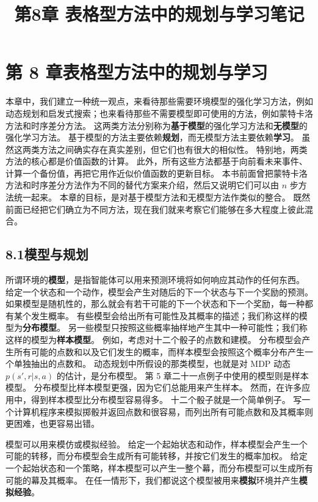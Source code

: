 \documentclass[UTF8,12pt,a4paper,fontset=fandol]{ctexart}
\title{第8章 表格型方法中的规划与学习笔记}
\author{}
\date{}
\begin{document}
\maketitle

\section*{第 8 章\quad 表格型方法中的规划与学习}

本章中，我们建立一种统一观点，来看待那些需要环境模型的强化学习方法，例如动态规划和启发式搜索；也来看待那些不需要模型即可使用的方法，例如蒙特卡洛方法和时序差分方法。
这两类方法分别称为\textbf{基于模型}的强化学习方法和\textbf{无模型}的强化学习方法。
基于模型的方法主要依赖\textbf{规划}，而无模型方法主要依赖\textbf{学习}。
虽然这两类方法之间确实存在真实差别，但它们也有很大的相似性。
特别地，两类方法的核心都是价值函数的计算。
此外，所有这些方法都基于向前看未来事件、计算一个备份值，再把它用作近似价值函数的更新目标。
本书前面曾把蒙特卡洛方法和时序差分方法作为不同的替代方案来介绍，然后又说明它们可以由 $n$ 步方法统一起来。
本章的目标，是对基于模型方法和无模型方法作类似的整合。
既然前面已经把它们确立为不同方法，现在我们就来考察它们能够在多大程度上彼此混合。

\subsection*{8.1\quad 模型与规划}

所谓环境的\textbf{模型}，是指智能体可以用来预测环境将如何响应其动作的任何东西。
给定一个状态和一个动作，模型会产生对随后的下一个状态与下一个奖励的预测。
如果模型是随机性的，那么就会有若干可能的下一个状态和下一个奖励，每一种都有某个发生概率。
有些模型会给出所有可能性及其概率的描述；我们称这样的模型为\textbf{分布模型}。
另一些模型只按照这些概率抽样地产生其中一种可能性；我们称这样的模型为\textbf{样本模型}。
例如，考虑对十二个骰子的点数和建模。
分布模型会产生所有可能的点数和以及它们发生的概率，而样本模型会按照这个概率分布产生一个单独抽出的点数和。
动态规划中所假设的那类模型，也就是对 MDP 动态 $p(s',r|s,a)$ 的估计，是分布模型。
第 5 章二十一点例子中使用的模型则是样本模型。
分布模型比样本模型更强，因为它们总能用来产生样本。
然而，在许多应用中，得到样本模型比分布模型容易得多。
十二个骰子就是一个简单例子。
写一个计算机程序来模拟掷骰并返回点数和很容易，而列出所有可能点数和及其概率则更困难，也更容易出错。

模型可以用来模仿或模拟经验。
给定一个起始状态和动作，样本模型会产生一个可能的转移，而分布模型会生成所有可能转移，并按它们发生的概率加权。
给定一个起始状态和一个策略，样本模型可以产生一整个幕，而分布模型可以生成所有可能的幕及其概率。
在任一情形下，我们都说这个模型被用来\textbf{模拟}环境并产生\textbf{模拟经验}。
\end{document}
